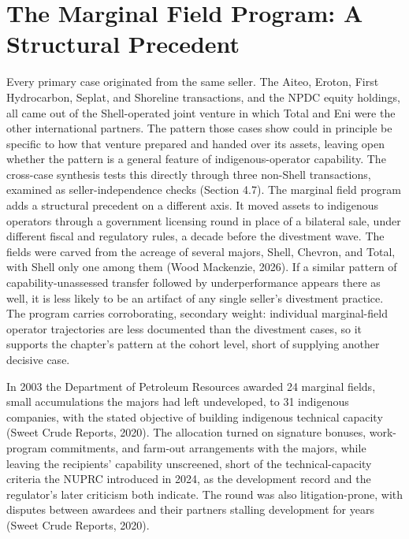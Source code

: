 \hypertarget{the-marginal-field-program-a-structural-precedent}{%
\section{The Marginal Field Program: A Structural
Precedent}\label{the-marginal-field-program-a-structural-precedent}}

Every primary case originated from the same seller. The Aiteo, Eroton,
First Hydrocarbon, Seplat, and Shoreline transactions, and the NPDC
equity holdings, all came out of the Shell-operated joint venture in
which Total and Eni were the other international partners. The pattern
those cases show could in principle be specific to how that venture
prepared and handed over its assets, leaving open whether the pattern is
a general feature of indigenous-operator capability. The cross-case
synthesis tests this directly through three non-Shell transactions,
examined as seller-independence checks (Section 4.7). The marginal field
program adds a structural precedent on a different axis. It moved assets
to indigenous operators through a government licensing round in place of
a bilateral sale, under different fiscal and regulatory rules, a decade
before the divestment wave. The fields were carved from the acreage of
several majors, Shell, Chevron, and Total, with Shell only one among
them (Wood Mackenzie, 2026). If a similar pattern of
capability-unassessed transfer followed by underperformance appears
there as well, it is less likely to be an artifact of any single
seller's divestment practice. The program carries corroborating,
secondary weight: individual marginal-field operator trajectories are
less documented than the divestment cases, so it supports the chapter's
pattern at the cohort level, short of supplying another decisive case.

In 2003 the Department of Petroleum Resources awarded 24 marginal
fields, small accumulations the majors had left undeveloped, to 31
indigenous companies, with the stated objective of building indigenous
technical capacity (Sweet Crude Reports, 2020). The allocation turned on
signature bonuses, work-program commitments, and farm-out arrangements
with the majors, while leaving the recipients' capability unscreened,
short of the technical-capacity criteria the NUPRC introduced in 2024,
as the development record and the regulator's later criticism both
indicate. The round was also litigation-prone, with disputes between
awardees and their partners stalling development for years (Sweet Crude
Reports, 2020).

